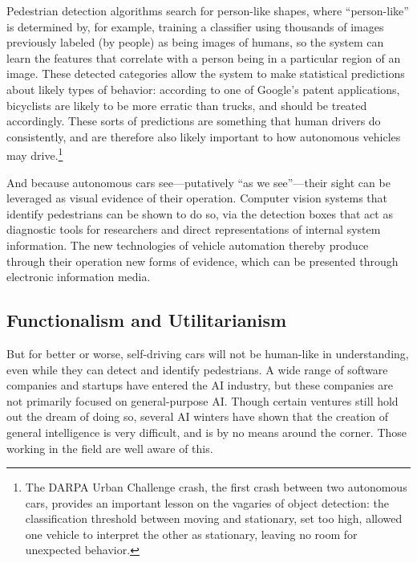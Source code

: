 Pedestrian detection algorithms search for person-like shapes, where
“person-like” is determined by, for example, training a classifier
using thousands of images previously labeled (by people) as being images of humans, so
the system can learn the features that correlate with a person being
in a particular region of an image. These detected categories allow the system to make
statistical predictions about likely types of behavior: according to
one of Google's patent applications, bicyclists are likely to be more
erratic than trucks, and should be treated
accordingly.\cite{predictPatent} These sorts of predictions are
something that human drivers do consistently, and are therefore also
likely important to how autonomous vehicles may drive.\footnote{The
  DARPA Urban Challenge crash, the first crash between two autonomous
  cars, provides an important lesson on the vagaries of object
  detection: the classification threshold between moving and
  stationary, set too high, allowed one vehicle to interpret the other
  as stationary, leaving no room for unexpected behavior.\cite{???}} 

And because autonomous cars see---putatively “as we see”---their sight can
be leveraged as visual evidence of their operation. Computer vision systems that identify
pedestrians can be shown to do so, via the detection boxes that act as
diagnostic tools for researchers and direct representations of
internal system information. The new technologies of vehicle automation thereby produce through
their operation new forms of evidence, which can be presented through
electronic information media.


\subsection{Functionalism and Utilitarianism} 
But for better or worse, self-driving cars will not be human-like in
understanding, even while they can detect and identify pedestrians.
A wide range of software companies and startups have entered the AI
industry, but these companies are not primarily focused on
general-purpose AI. Though certain ventures still hold out the dream
of doing so, several AI winters have shown that the creation of
general intelligence is very difficult, and is by no means around the
corner. Those working in the field are well aware of
this.\cite{???-articlerebuttingmusk} 

